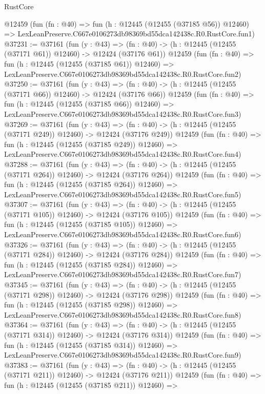 \begin{lexlean}{RustCore}
\begin{coremodule}
    @12459
    (fun (fn : @40) =>
    fun (h : @12445 (@12455 (@37185 @56)) @12460) =>
    LexLeanPreserve.C667e0106273db98369bd55dca142438c.R0.RustCore.fun1)
@37231 := @37161
    (fun (y : @43) =>
    (fn : @40) -> (h : @12445 (@12455 (@37171 @61)) @12460) -> @12424 (@37176 @61))
    @12459
    (fun (fn : @40) =>
    fun (h : @12445 (@12455 (@37185 @61)) @12460) =>
    LexLeanPreserve.C667e0106273db98369bd55dca142438c.R0.RustCore.fun2)
@37250 := @37161
    (fun (y : @43) =>
    (fn : @40) -> (h : @12445 (@12455 (@37171 @66)) @12460) -> @12424 (@37176 @66))
    @12459
    (fun (fn : @40) =>
    fun (h : @12445 (@12455 (@37185 @66)) @12460) =>
    LexLeanPreserve.C667e0106273db98369bd55dca142438c.R0.RustCore.fun3)
@37269 := @37161
    (fun (y : @43) =>
    (fn : @40) -> (h : @12445 (@12455 (@37171 @249)) @12460) -> @12424 (@37176 @249))
    @12459
    (fun (fn : @40) =>
    fun (h : @12445 (@12455 (@37185 @249)) @12460) =>
    LexLeanPreserve.C667e0106273db98369bd55dca142438c.R0.RustCore.fun4)
@37288 := @37161
    (fun (y : @43) =>
    (fn : @40) -> (h : @12445 (@12455 (@37171 @264)) @12460) -> @12424 (@37176 @264))
    @12459
    (fun (fn : @40) =>
    fun (h : @12445 (@12455 (@37185 @264)) @12460) =>
    LexLeanPreserve.C667e0106273db98369bd55dca142438c.R0.RustCore.fun5)
@37307 := @37161
    (fun (y : @43) =>
    (fn : @40) -> (h : @12445 (@12455 (@37171 @105)) @12460) -> @12424 (@37176 @105))
    @12459
    (fun (fn : @40) =>
    fun (h : @12445 (@12455 (@37185 @105)) @12460) =>
    LexLeanPreserve.C667e0106273db98369bd55dca142438c.R0.RustCore.fun6)
@37326 := @37161
    (fun (y : @43) =>
    (fn : @40) -> (h : @12445 (@12455 (@37171 @284)) @12460) -> @12424 (@37176 @284))
    @12459
    (fun (fn : @40) =>
    fun (h : @12445 (@12455 (@37185 @284)) @12460) =>
    LexLeanPreserve.C667e0106273db98369bd55dca142438c.R0.RustCore.fun7)
@37345 := @37161
    (fun (y : @43) =>
    (fn : @40) -> (h : @12445 (@12455 (@37171 @298)) @12460) -> @12424 (@37176 @298))
    @12459
    (fun (fn : @40) =>
    fun (h : @12445 (@12455 (@37185 @298)) @12460) =>
    LexLeanPreserve.C667e0106273db98369bd55dca142438c.R0.RustCore.fun8)
@37364 := @37161
    (fun (y : @43) =>
    (fn : @40) -> (h : @12445 (@12455 (@37171 @314)) @12460) -> @12424 (@37176 @314))
    @12459
    (fun (fn : @40) =>
    fun (h : @12445 (@12455 (@37185 @314)) @12460) =>
    LexLeanPreserve.C667e0106273db98369bd55dca142438c.R0.RustCore.fun9)
@37383 := @37161
    (fun (y : @43) =>
    (fn : @40) -> (h : @12445 (@12455 (@37171 @211)) @12460) -> @12424 (@37176 @211))
    @12459
    (fun (fn : @40) =>
    fun (h : @12445 (@12455 (@37185 @211)) @12460) =>

\end{coremodule}
\end{lexlean}
